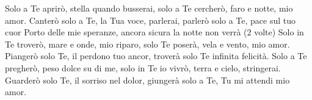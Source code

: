 \beginverse
Solo a Te aprirò, stella quando busserai,
solo a Te cercherò, faro e notte, mio amor.
Canterò solo a Te, la Tua voce, parlerai,
parlerò solo a Te, pace sul tuo cuor
\endverse
\beginchorus
Porto delle mie speranze,
ancora sicura la notte non verrà (2 volte)
\endchorus
\beginverse
Solo in Te troverò, mare e onde, mio riparo,
solo Te poserà, vela e vento, mio amor.
Piangerò solo Te, il perdono tuo ancor,
troverà solo Te infinita felicità.
\endverse \beginverse
Solo a Te pregherò, peso dolce su di me,
solo in Te io vivrò, terra e cielo, stringerai.
Guarderò solo Te, il sorriso nel dolor,
giungerà solo a Te, Tu mi attendi mio amor.
\endverse
\endsong
